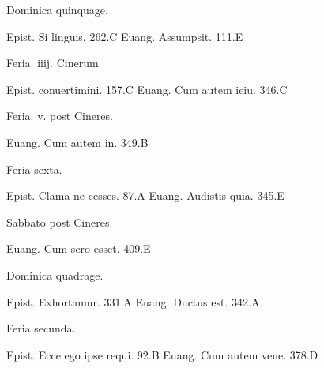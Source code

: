 \documentclass[a5paper,10pt]{book}
\begin{document}
\begin{multicols}{2}
\newline \vspace{-1.75em}
\begin{center}
\color{red} Dominica quinquage.
\end{center}
\vspace{-.75em}
\par \noindent Epist. Si linguis. \hfill 262.C
\newline Euang. Assumpsit. \hfill 111.E
\newline \vspace{-1.75em}
\begin{center}
\color{red} Feria. iiij. Cinerum
\end{center}
\vspace{-.75em}
\par \noindent Epist. conuertimini. \hfill 157.C
\newline Euang. Cum autem ieiu. \hfill 346.C
\newline \vspace{-1.75em}
\begin{center}
\color{red} Feria. v. post Cineres.
\end{center}
\vspace{-.75em}
\par \noindent Euang. Cum autem in. \hfill 349.B
\newline \vspace{-1.75em}
\begin{center}
\color{red} Feria sexta.
\end{center}
\vspace{-.75em}
\par \noindent Epist. Clama ne cesses. \hfill 87.A
\newline Euang. Audistis quia. \hfill 345.E
\newline \vspace{-1.75em}
\begin{center}
\color{red} Sabbato post Cineres.
\end{center}
\vspace{-.75em}
\par \noindent Euang. Cum sero esset. \hfill 409.E
\newline \vspace{-1.75em}
\begin{center}
\color{red} Dominica quadrage.
\end{center}
\vspace{-.75em}
\par \noindent Epist. Exhortamur. \hfill 331.A
\newline Euang. Ductus est. \hfill 342.A
\newline \vspace{-1.75em}
\begin{center}
\color{red} Feria secunda.
\end{center}
\vspace{-.75em}
\par \noindent Epist. Ecce ego ipse requi. \hfill 92.B
\newline Euang. Cum autem vene. \hfill 378.D










\end{multicols}
\end{document}
